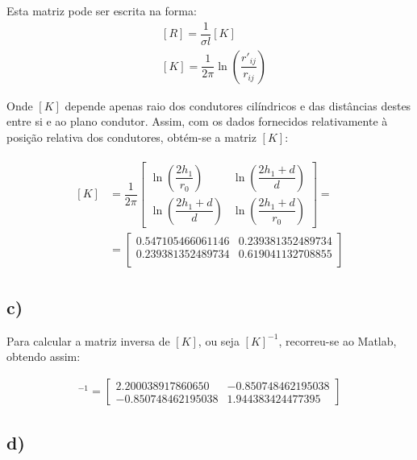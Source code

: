 \documentclass[portuguese, a4paper]{article}
\begin{document}
	\par
	Esta matriz pode ser escrita na forma:
	\begin{align*}
		&[R] = \dfrac{1}{\sigma l} [K] \\
		&[K] = \dfrac{1}{2 \pi} \ln\left(\dfrac{r'_{ij} }{r_{ij} }\right)
	\end{align*}

	\par
	Onde $[K]$ depende apenas raio dos condutores cilíndricos e das distâncias destes entre si e ao plano condutor. Assim, com os dados fornecidos relativamente à posição relativa dos condutores, obtém-se a matriz $[K]$:

	\begin{align*}
		\begin{split}
		[K] &= \dfrac{1}{2\pi}
		\begin{bmatrix}
			\ln\left(\dfrac{2h_1}{r_0}\right) & \ln\left(\dfrac{2h_1 + d}{d}\right)  \\[1em]
			\ln\left(\dfrac{2h_1 + d}{d}\right) & \ln\left(\dfrac{2h_1 + d}{r_0}\right)
		\end{bmatrix} = \\
		&= \begin{bmatrix}
			0.547105466061146 & 0.239381352489734 \\
			0.239381352489734 & 0.619041132708855 \\
		\end{bmatrix}
		\end{split}
		\end{align*}

	\subsection{c)}

		\par
		Para calcular a matriz inversa de $[K]$, ou seja $[K]^{-1}$, recorreu-se ao Matlab, obtendo assim:

		\begin{align*}
			[K]^{-1} =
			\begin{bmatrix}
				2.200038917860650  & -0.850748462195038 \\
  				-0.850748462195038 & 1.944383424477395
			\end{bmatrix}
		\end{align*}

	\subsection{d)}
\end{document}
